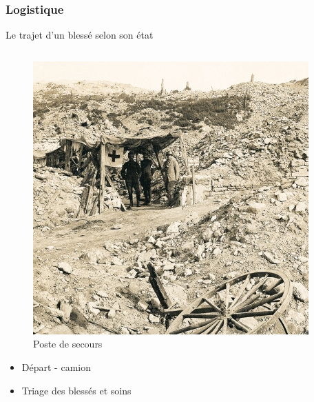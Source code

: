 \documentclass{beamer}
\renewcommand{\tiny}{\fontsize{6pt}{7pt}\selectfont}
\renewcommand{\normalsize}{\fontsize{10pt}{12pt}\selectfont}
\renewcommand{\Large}{\fontsize{20pt}{33pt}\selectfont}
\begin{document}
			\subsubsection{Logistique}
			{\begin{frame}

				\Large Le trajet d'un blessé selon son état\\
				\vskip0.7cm
				\normalsize\itshape
				\begin{columns}
				
				
					\begin{column}[t]{0.25\linewidth}
						\begin{figure}
							\includegraphics[width=0.8\linewidth, height=0.8\linewidth]{pics/III1b}
							
							\caption{\tiny Poste de secours}
						\end{figure}
						\begin{itemize}
							\item \tiny Départ - camion
							\item \tiny Triage des blessés et soins
						\end{itemize}
					\end{column}
				

\end{columns}
\end{frame}}
\end{document}
